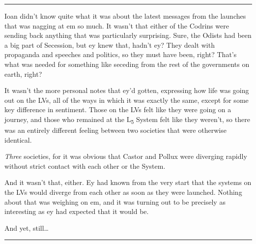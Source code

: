 \vspace{0.5em}

\begin{center}\rule{0.5\linewidth}{0.5pt}\end{center}

\vspace{1em}

\noindent Ioan didn't know quite what it was about the latest messages from the launches that was nagging at em so much. It wasn't that either of the Codrins were sending back anything that was particularly surprising. Sure, the Odists had been a big part of Secession, but ey knew that, hadn't ey? They dealt with propaganda and speeches and politics, so they must have been, right? That's what was needed for something like seceding from the rest of the governments on earth, right?

It wasn't the more personal notes that ey'd gotten, expressing how life was going out on the LVs, all of the ways in which it was exactly the same, except for some key difference in sentiment. Those on the LVs felt like they were going on a journey, and those who remained at the L\textsubscript{5} System felt like they weren't, so there was an entirely different feeling between two societies that were otherwise identical.

\emph{Three} societies, for it was obvious that Castor and Pollux were diverging rapidly without strict contact with each other or the System.

And it wasn't that, either. Ey had known from the very start that the systems on the LVs would diverge from each other as soon as they were launched. Nothing about that was weighing on em, and it was turning out to be precisely as interesting as ey had expected that it would be.

And yet, still\ldots{}

\begin{center}\rule{0.5\linewidth}{0.5pt}\end{center}

